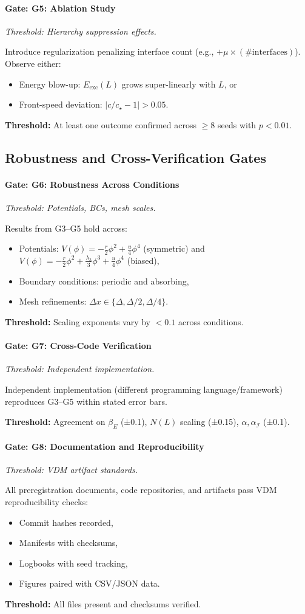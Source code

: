 \documentclass{article}
\newenvironment{vdmgate}[2]{%
  \paragraph{Gate: #1} \emph{Threshold: #2.}%
  \par\noindent}{\medskip}
\begin{document}
\begin{vdmgate}{G5: Ablation Study}{Hierarchy suppression effects}
Introduce regularization penalizing interface count (e.g., $+\mu \times (\#\text{interfaces})$). Observe either:
\begin{itemize}[noitemsep]
\item Energy blow-up: $E_{\text{exc}}(L)$ grows super-linearly with $L$, or
\item Front-speed deviation: $|c/c_\star - 1| > 0.05$.
\end{itemize}

\textbf{Threshold:} At least one outcome confirmed across $\geq 8$ seeds with $p < 0.01$.
\end{vdmgate}

\subsection*{Robustness and Cross-Verification Gates}

\begin{vdmgate}{G6: Robustness Across Conditions}{Potentials, BCs, mesh scales}
Results from G3--G5 hold across:
\begin{itemize}[noitemsep]
\item Potentials: $V(\phi) = -\frac{r}{2}\phi^2 + \frac{u}{4}\phi^4$ (symmetric) and $V(\phi) = -\frac{r}{2}\phi^2 + \frac{\lambda_3}{3}\phi^3 + \frac{u}{4}\phi^4$ (biased),
\item Boundary conditions: periodic and absorbing,
\item Mesh refinements: $\Delta x \in \{\Delta, \Delta/2, \Delta/4\}$.
\end{itemize}

\textbf{Threshold:} Scaling exponents vary by $< 0.1$ across conditions.
\end{vdmgate}

\begin{vdmgate}{G7: Cross-Code Verification}{Independent implementation}
Independent implementation (different programming language/framework) reproduces G3--G5 within stated error bars.

\textbf{Threshold:} Agreement on $\beta_E$ (±0.1), $N(L)$ scaling (±0.15), $\alpha, \alpha_{\mathcal{I}}$ (±0.1).
\end{vdmgate}

\begin{vdmgate}{G8: Documentation and Reproducibility}{VDM artifact standards}
All preregistration documents, code repositories, and artifacts pass VDM reproducibility checks:
\begin{itemize}[noitemsep]
\item Commit hashes recorded,
\item Manifests with checksums,
\item Logbooks with seed tracking,
\item Figures paired with CSV/JSON data.
\end{itemize}

\textbf{Threshold:} All files present and checksums verified.
\end{vdmgate}
\end{document}
